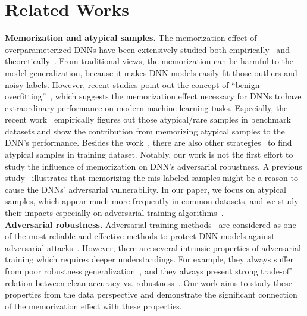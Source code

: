 \vspace{-0.4cm}
\section{Related Works}
\vspace{-0.3cm}
\textbf{Memorization and atypical samples.} The memorization effect of overparameterized DNNs have been extensively studied both empirically~\cite{zhang2016understanding, nakkiran2019deep} and theoretically~\cite{bartlett2002rademacher}. From traditional views, the memorization can be harmful to the model generalization, because it makes DNN models easily fit those outliers and noisy labels.  However, recent studies point out the concept of ``benign overfitting''~\cite{bartlett2020benign, feldman2020does, feldman2020neural}, which suggests the memorization effect necessary for DNNs to have extraordinary performance on modern machine learning tasks. 
Especially, the recent work~\cite{feldman2020neural} empirically figures out those atypical/rare samples in benchmark datasets and show the contribution from memorizing atypical samples to the DNN's performance. Besides the work~\cite{feldman2020neural}, there are also other strategies~\cite{carlini2019distribution} to find atypical samples in training dataset.  Notably, our work is not the first effort to study the influence of memorization on DNN's adversarial robustness. A previous study~\cite{sanyal2020benign} illustrates that memorizing the mis-labeled samples might be a reason to cause the DNNs' adversarial vulnerability. In our paper, we focus on atypical samples, which appear much more frequently in common datasets, and we study their impacts especially on adversarial training algorithms~\cite{madry2017towards, zhang2019theoretically,chatterji2020finite, muthukumar2020harmless}.\\
\textbf{Adversarial robustness. } 
Adversarial training methods~\cite{madry2017towards, zhang2019theoretically, wang2019improving, zhang2016understanding, rice2020overfitting} are considered as one of the most reliable and effective methods to protect DNN models against adversarial attacks~\cite{goodfellow2014explaining, xu2019adversarial}. However, there are several intrinsic properties of adversarial training which requires deeper understandings. 
For example, they always suffer from poor robustness generalization~\cite{ schmidt2018adversarially, rice2020overfitting}, and they always present strong trade-off relation between clean accuracy vs. robustness~\cite{tsipras2018robustness, zhang2019theoretically}. Our work aims to study these properties from the data perspective and demonstrate the significant connection of the memorization effect with these properties.

